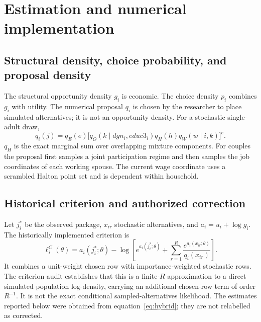 \documentclass[11pt,a4paper]{article}
\begin{document}
\section{Estimation and numerical implementation}

\subsection{Structural density, choice probability, and proposal density}

The structural opportunity density $g_i$ is economic. The choice density $p_i$
combines $g_i$ with utility. The numerical proposal $q_i$ is chosen by the
researcher to place simulated alternatives; it is not an opportunity density.
For a stochastic single-adult draw,
\begin{equation}
q_i(j)=q_E(e)\bigl[q_O(k\mid dgn_i,educ3_i)q_H(h)q_W(w\mid i,k)\bigr]^e.
\end{equation}
$q_H$ is the exact marginal sum over overlapping mixture components. For
couples the proposal first samples a joint participation regime and then samples
the job coordinates of each working spouse. The current wage coordinate uses a
scrambled Halton point set and is dependent within household.

\subsection{Historical criterion and authorized correction}

Let $j_i^*$ be the observed package, $x_{ir}$ stochastic alternatives, and
$a_i=u_i+\log g_i$. The historically implemented criterion is
\begin{equation}
\ell_i^C(\theta)=a_i(j_i^*;\theta)-
\log\!\left[e^{a_i(j_i^*;\theta)}+
\sum_{r=1}^{R}\frac{e^{a_i(x_{ir};\theta)}}{q_i(x_{ir})}\right].
\label{eq:hybrid}
\end{equation}
It combines a unit-weight chosen row with importance-weighted stochastic rows.
The criterion audit establishes that this is a finite-$R$ approximation to a
direct simulated population log-density, carrying an additional chosen-row
term of order $R^{-1}$. It is not the exact conditional sampled-alternatives
likelihood. The estimates reported below were obtained from
equation~\eqref{eq:hybrid}; they are not relabelled as corrected.
\end{document}
